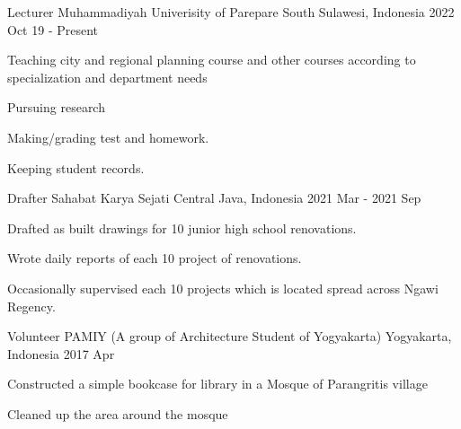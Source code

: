

\begin{cventries}
  \cventry
    {Lecturer} %
    {Muhammadiyah Univerisity of Parepare} %
    {South Sulawesi, Indonesia} %
    {2022 Oct 19  - Present} %
    {
      \begin{cvitems} %
      \item{Teaching city and regional planning course and other courses according to specialization and department needs}
      \item{Pursuing research}
        \item {Making/grading test and homework.}
        \item{Keeping student records.}
      \end{cvitems}
    }


  \cventry
    {Drafter} %
    {Sahabat Karya Sejati} %
    {Central Java, Indonesia} %
    {2021 Mar - 2021 Sep} %
    {
      \begin{cvitems} %
        \item {Drafted as built drawings for 10 junior high school renovations.}
        \item{Wrote daily reports of each 10 project of renovations.}
        \item{Occasionally supervised each 10 projects which is located spread across Ngawi Regency.}
      \end{cvitems}
    }


  \cventry
    {Volunteer} %
    {PAMIY (A group of Architecture Student of Yogyakarta)} %
    {Yogyakarta, Indonesia} %
    {2017 Apr} %
    {
      \begin{cvitems} %
        \item {Constructed a simple bookcase for library in a Mosque of Parangritis village }
        \item{Cleaned up the area around the mosque}
      \end{cvitems}
    }



\end{cventries}
